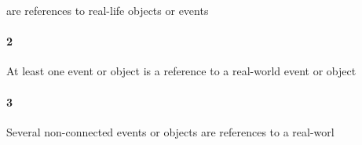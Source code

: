  are references to real-life objects or events\paragraph{2}At least one event or object is a reference to a real-world event or object\paragraph{3}Several non-connected events or objects are references to a real-worl